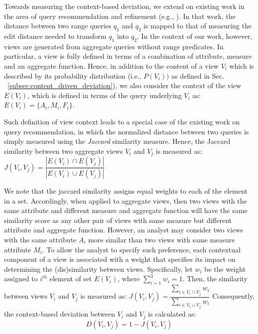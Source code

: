 %
Towards measuring the context-based deviation, we extend on existing work in the area of query recommendation and refinement (e.g., \cite{DBLP:conf/sigmod/TranC10,DBLP:conf/dexa/Kantere16,DBLP:conf/cikm/KantereOKS15}).
%
In that work, the distance between two range queries $q_1$ and $q_2$ is mapped to that of measuring the edit distance needed to transform $q_1$ into $q_2$. %
%
In the context of our work, however, views are generated from aggregate queries without range predicates. 
%
In particular, a view is fully defined in terms of a combination of attribute, measure and an aggregate function.
%
Hence, in addition to the content of a view $V_i$ which is described by its probability distribution (i.e., $P(V_i))$ as defined in Sec. ~\ref{subsec:content_driven_deviation}), we also consider the context of the view $E(V_i)$, which is defined in terms of the query underlying $V_i$ as:
%
$E(V_{i})=  \{A_i, M_i, F_i\}$.




Such definition of view context leads to a special case of the existing work on query recommendation, in which the normalized distance between two queries is simply measured using the {\em Jaccard} similarity measure.
%
Hence, the Jaccard similarity between two aggregate views $V_i$ and $V_j$ is measured as: $ J(V_{i}, V_{j} ) = \dfrac{| E(V_{i}) \cap E(V_{j}) |}{| E(V_{i}) \cup E(V_{j})|} $	

We note that the jaccard similarity assigns equal weights to each of the element in a set. 
%
Accordingly, when applied to aggregate views, then two views with the same attribute and different measure and aggregate function will have the same similarity score as any other pair of views with same measure but different attribute and aggregate function. 
%
However, an analyst may consider two views with the same attribute $A_i$ more similar than two views with same measure attribute $M_i$. 
%
To allow the analyst to specify such preference, each contextual component of a view is associated with a weight that specifies its impact on determining the (dis)similarity between views. 
%
Specifically, let $w_i$ be the weight assigned to $i^{th}$ element of set $E(V_i)$, where $\sum_{i=1}^{3}w_i =1$.
%
Then, the similarity between views $V_i$ and $V_j$ is measured as: $J(V_{i}, V_{j} ) = \dfrac{\sum_{i\in V_i \cap V_j}w_i}{\sum_{i\in V_i \cup V_j}w_i} $
%	
Consequently, the context-based deviation between $V_i$ and $V_j$ is calculated as:
\vspace{-4pt}
\begin{equation}
D\left(V_{i}, V_{j} \right) = 1- J\left(V_{i}, V_{j} \right) 
\label{diversity_score}                 
\end{equation}
\vspace{-14pt}



